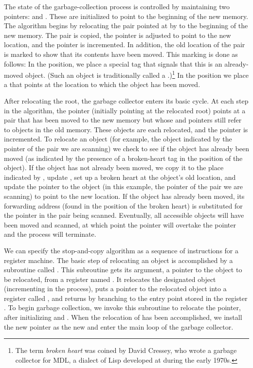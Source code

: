 The state of the garbage-collection process is controlled by maintaining two
pointers:  and .  These are initialized to point to the
beginning of the new memory.  The algorithm begins by relocating the pair
pointed at by  to the beginning of the new memory.  The pair is
copied, the  pointer is adjusted to point to the new location, and
the  pointer is incremented.  In addition, the old location of the
pair is marked to show that its contents have been moved.  This marking is done
as follows: In the  position, we place a special tag that signals
that this is an already-moved object.  (Such an object is traditionally called
a .)\footnote{The term \emph{broken heart} was coined by
David Cressey, who wrote a garbage collector for MDL, a dialect of Lisp
developed at  during the early 1970s.}  In the  position
we place a  that points at the location to which
the object has been moved.

After relocating the root, the garbage collector enters its basic cycle.  At
each step in the algorithm, the  pointer (initially pointing at the
relocated root) points at a pair that has been moved to the new memory but
whose  and  pointers still refer to objects in the old
memory.  These objects are each relocated, and the  pointer is
incremented.  To relocate an object (for example, the object indicated by the
 pointer of the pair we are scanning) we check to see if the object
has already been moved (as indicated by the presence of a broken-heart tag in
the  position of the object).  If the object has not already been
moved, we copy it to the place indicated by , update ,
set up a broken heart at the object's old location, and update the pointer to
the object (in this example, the  pointer of the pair we are
scanning) to point to the new location.  If the object has already been moved,
its forwarding address (found in the  position of the broken heart)
is substituted for the pointer in the pair being scanned.  Eventually, all
accessible objects will have been moved and scanned, at which point the
 pointer will overtake the  pointer and the process will
terminate.

We can specify the stop-and-copy algorithm as a sequence of instructions for a
register machine.  The basic step of relocating an object is accomplished by a
subroutine called .  This subroutine gets its
argument, a pointer to the object to be relocated, from a register named
.  It relocates the designated object (incrementing  in
the process), puts a pointer to the relocated object into a register called
, and returns by branching to the entry point stored in the register
.  To begin garbage collection, we invoke this
subroutine to relocate the  pointer, after initializing 
and .  When the relocation of  has been accomplished, we
install the new pointer as the new  and enter the main loop of the
garbage collector.

